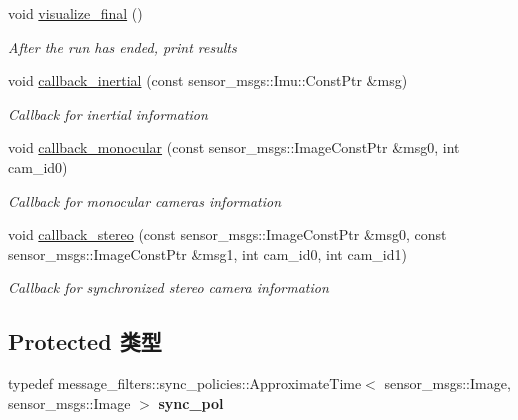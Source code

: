 \begin{DoxyCompactItemize}
void \hyperlink{classov__msckf_1_1ROS1Visualizer_a08dbac86db9d9e7bfb80a1a10202df9e}{visualize\+\_\+final} ()
\begin{DoxyCompactList}\small\item\em After the run has ended, print results \end{DoxyCompactList}\item 
\mbox{\label{classov__msckf_1_1ROS1Visualizer_a2f1cd044b066db51d6637933abed5549}} 
void \hyperlink{classov__msckf_1_1ROS1Visualizer_a2f1cd044b066db51d6637933abed5549}{callback\+\_\+inertial} (const sensor\+\_\+msgs\+::\+Imu\+::\+Const\+Ptr \&msg)
\begin{DoxyCompactList}\small\item\em Callback for inertial information \end{DoxyCompactList}\item 
\mbox{\label{classov__msckf_1_1ROS1Visualizer_ac0e01dd741b752ba22e0e9eba40675a0}} 
void \hyperlink{classov__msckf_1_1ROS1Visualizer_ac0e01dd741b752ba22e0e9eba40675a0}{callback\+\_\+monocular} (const sensor\+\_\+msgs\+::\+Image\+Const\+Ptr \&msg0, int cam\+\_\+id0)
\begin{DoxyCompactList}\small\item\em Callback for monocular cameras information \end{DoxyCompactList}\item 
\mbox{\label{classov__msckf_1_1ROS1Visualizer_a1f8e90c31c8b4b6dcd33e05b839cdaa2}} 
void \hyperlink{classov__msckf_1_1ROS1Visualizer_a1f8e90c31c8b4b6dcd33e05b839cdaa2}{callback\+\_\+stereo} (const sensor\+\_\+msgs\+::\+Image\+Const\+Ptr \&msg0, const sensor\+\_\+msgs\+::\+Image\+Const\+Ptr \&msg1, int cam\+\_\+id0, int cam\+\_\+id1)
\begin{DoxyCompactList}\small\item\em Callback for synchronized stereo camera information \end{DoxyCompactList}\end{DoxyCompactItemize}
\subsection*{Protected 类型}
\begin{DoxyCompactItemize}
\item 
\mbox{\label{classov__msckf_1_1ROS1Visualizer_a49f1e0c6fb04e4baa4ea64b0ae982056}} 
typedef message\+\_\+filters\+::sync\+\_\+policies\+::\+Approximate\+Time$<$ sensor\+\_\+msgs\+::\+Image, sensor\+\_\+msgs\+::\+Image $>$ {\bfseries sync\+\_\+pol}
\end{DoxyCompactItemize}
